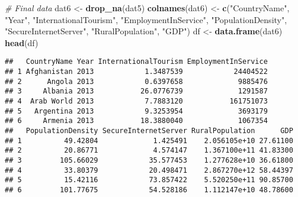 \documentclass[ignorenonframetext,]{beamer}
\newenvironment{Shaded}{\begin{snugshade}}{\end{snugshade}}
\newcommand{\CommentTok}[1]{\textcolor[rgb]{0.56,0.35,0.01}{\textit{#1}}}
\newcommand{\DataTypeTok}[1]{\textcolor[rgb]{0.13,0.29,0.53}{#1}}
\newcommand{\KeywordTok}[1]{\textcolor[rgb]{0.13,0.29,0.53}{\textbf{#1}}}
\newcommand{\NormalTok}[1]{#1}
\newcommand{\OperatorTok}[1]{\textcolor[rgb]{0.81,0.36,0.00}{\textbf{#1}}}
\newcommand{\StringTok}[1]{\textcolor[rgb]{0.31,0.60,0.02}{#1}}
\begin{document}
\begin{frame}[fragile]
\begin{Shaded}
\begin{Highlighting}[]
\CommentTok{# Final data}
\NormalTok{dat6 <-}\StringTok{ }\KeywordTok{drop_na}\NormalTok{(dat5)}
\KeywordTok{colnames}\NormalTok{(dat6) <-}\StringTok{ }\KeywordTok{c}\NormalTok{(}\StringTok{"CountryName"}\NormalTok{, }\StringTok{"Year"}\NormalTok{, }\StringTok{"InternationalTourism"}\NormalTok{, }\StringTok{"EmploymentInService"}\NormalTok{, }\StringTok{"PopulationDensity"}\NormalTok{, }\StringTok{"SecureInternetServer"}\NormalTok{, }\StringTok{"RuralPopulation"}\NormalTok{, }\StringTok{"GDP"}\NormalTok{)}
\NormalTok{df <-}\StringTok{ }\KeywordTok{data.frame}\NormalTok{(dat6)}
\KeywordTok{head}\NormalTok{(df)}
\end{Highlighting}
\end{Shaded}

\begin{verbatim}
##   CountryName Year InternationalTourism EmploymentInService
## 1 Afghanistan 2013            1.3487539            24404522
## 2      Angola 2013            0.6397658             9885476
## 3     Albania 2013           26.0776739             1291587
## 4  Arab World 2013            7.7883120           161751073
## 5   Argentina 2013            9.3253954             3693179
## 6     Armenia 2013           18.3880040             1067354
##   PopulationDensity SecureInternetServer RuralPopulation      GDP
## 1          49.42804             1.425491    2.056105e+10 27.61100
## 2          20.86771             4.574147    1.367100e+11 41.83300
## 3         105.66029            35.577453    1.277628e+10 36.61800
## 4          33.80379            20.498471    2.867270e+12 58.44397
## 5          15.42116            73.857422    5.520250e+11 90.85700
## 6         101.77675            54.528186    1.112147e+10 48.78600
\end{verbatim}

\begin{Shaded}
\end{Shaded}


\end{frame}
\end{document}
